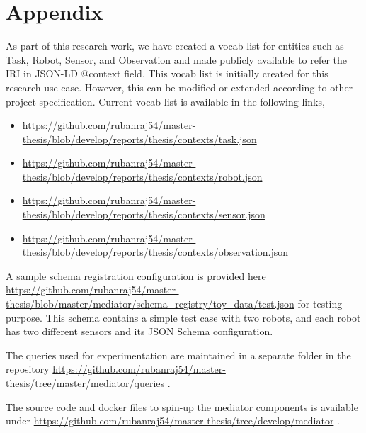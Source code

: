 

\let\cleardoublepage\clearpage
    \chapter{Appendix} \label{appendix}

	As part of this research work, we have created a vocab list for entities such as Task, Robot, Sensor, and Observation and made publicly available to refer the IRI in JSON-LD @context field. This vocab list is initially created for this research use case. However, this can be modified or extended according to other project specification. Current vocab list is available in the following links,
	
	\begin{itemize}
		\item \url{https://github.com/rubanraj54/master-thesis/blob/develop/reports/thesis/contexts/task.json}
		\item \url{https://github.com/rubanraj54/master-thesis/blob/develop/reports/thesis/contexts/robot.json}
		\item \url{https://github.com/rubanraj54/master-thesis/blob/develop/reports/thesis/contexts/sensor.json}
		\item \url{https://github.com/rubanraj54/master-thesis/blob/develop/reports/thesis/contexts/observation.json}
								
	\end{itemize}
	
    A sample schema registration configuration is provided here \url{https://github.com/rubanraj54/master-thesis/blob/master/mediator/schema_registry/toy_data/test.json} for testing purpose. This schema contains a simple test case with two robots, and each robot has two different sensors and its JSON Schema configuration.
    
    The queries used for experimentation are maintained in a separate folder in the repository \url{https://github.com/rubanraj54/master-thesis/tree/master/mediator/queries} .
	
	The source code and docker files to spin-up the mediator components is available under \url{https://github.com/rubanraj54/master-thesis/tree/develop/mediator} .

%